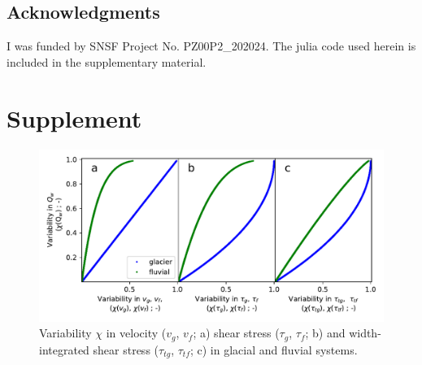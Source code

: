 \documentclass[11pt]{article}
\begin{document}
\begin{spacing}{1}
  \section{Acknowledgments}
  
  I was funded by SNSF Project No. PZ00P2\_202024.
  The julia code used herein is included in the supplementary material.
  
  
\end{spacing}





\section{Supplement}

\begin{center}
  \begin{figure}[H]
    \includegraphics[width=0.7\linewidth]{multi_run_vars.pdf}
    \caption{Variability $\chi$ in velocity ($v_g$, $v_f$; a) shear stress ($\tau_g$, $\tau_f$; b) and width-integrated shear stress ($\tau_{tg}$, $\tau_{tf}$; c)  in glacial and fluvial systems. }
    \label{fig:gammas}
  \end{figure}
\end{center}
\end{document}
